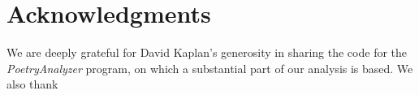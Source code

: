 \documentclass{book}
\begin{document}


\section*{Acknowledgments}
We are deeply grateful for David Kaplan's generosity in sharing the code for the \emph{PoetryAnalyzer} program, on which a substantial part of our analysis is based. We also thank 



\end{document}
